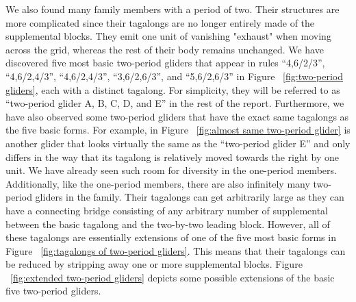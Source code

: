 \documentclass[12pt]{article}
\numberwithin{figure}{section} %
\begin{document}
We also found many family members with a period of two. Their structures are more complicated since their tagalongs are no longer entirely made of the supplemental blocks. They emit one unit of vanishing "exhaust" when moving across the grid, whereas the rest of their body remains unchanged. We have discovered five most basic two-period gliders that appear in rules “4,6/2/3”, “4,6/2,4/3”, “4,6/2,4/3”, “3,6/2,6/3”, and “5,6/2,6/3” in Figure ~\ref{fig:two-period gliders}, each with a distinct tagalong. For simplicity, they will be referred to as “two-period glider A, B, C, D, and E” in the rest of the report. Furthermore, we have also observed some two-period gliders that have the exact same tagalongs as the five basic forms. For example, in Figure ~\ref{fig:almost same two-period glider} is another glider that looks virtually the same as the “two-period glider E” and only differs in the way that its tagalong is relatively moved towards the right by one unit. We have already seen such room for diversity in the one-period members. Additionally, like the one-period members, there are also infinitely many two-period gliders in the family. Their tagalongs can get arbitrarily large as they can have a connecting bridge consisting of any arbitrary number of supplemental between the basic tagalong and the two-by-two leading block. However, all of these tagalongs are essentially extensions of one of the five most basic forms in Figure ~\ref{fig:tagalongs of two-period gliders}. This means that their tagalongs can be reduced by stripping away one or more supplemental blocks. Figure ~\ref{fig:extended two-period gliders} depicts some possible extensions of the basic five two-period gliders. 
\end{document}
